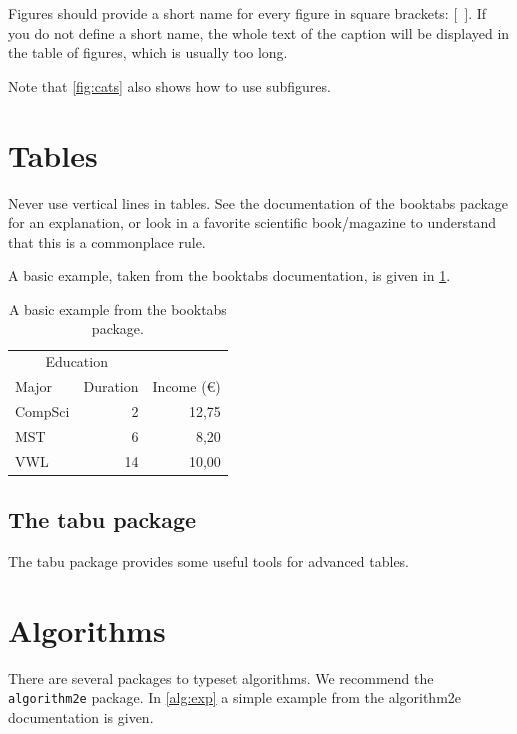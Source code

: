 \documentclass[12pt, %
a4paper, %
twoside, %
openright, %
abstract=on, %
DIV=11,      %
BCOR=8mm]{scrbook} %
\begin{document}
    Figures  should  provide a  short  name  for  every figure  in  square 
    brackets: $[$~$]$. If  you do not define a short  name, the whole text 
    of the caption will be displayed in the table of figures, which is 
    usually too long.
    
    Note that \cref{fig:cats} also shows how to use subfigures.



    \section{Tables}
    Never  use vertical  lines in  tables.  See  the documentation  of the 
    booktabs package for an explanation,  or look in a favorite scientific 
    book/magazine to understand that this is a commonplace rule.

    A basic  example, taken  from the booktabs  documentation, is  given in
    \cref{tab::ex}.

    \begin{table}
        \centering
        \begin{tabular}{@{}lrr@{}} 
            \toprule
            \multicolumn{2}{c}{Education}\\ \cmidrule{1-2}
            Major & Duration & Income (\euro)\\ 
            \midrule 
            CompSci & 2 & 12,75 \\ \addlinespace
            MST & 6 & 8,20 \\ \addlinespace
            VWL & 14 & 10,00\\ 
            \bottomrule
        \end{tabular}
        \caption[Table Example]{A basic example from the booktabs package.}
        \label{tab::ex}
    \end{table}

    \subsection{The tabu package}
    The tabu package provides some useful tools for advanced tables.


    \section{Algorithms}
    There are several packages to typeset algorithms.
    We recommend the \verb+algorithm2e+ package.
    In \cref{alg:exp} a simple example from the algorithm2e documentation is given.
\end{document}
